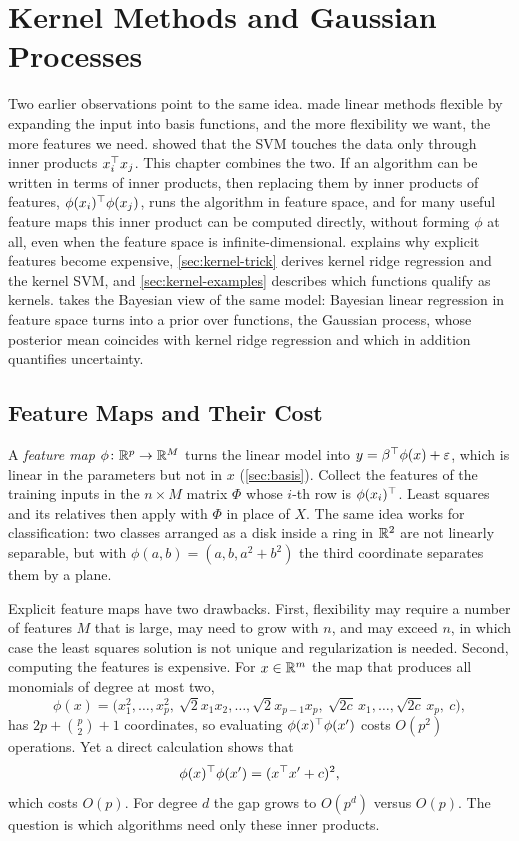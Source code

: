 \chapter{Kernel Methods and Gaussian Processes}\label{ch:kernels}

Two earlier observations point to the same idea.  made linear methods flexible by expanding the input into basis functions, and the more flexibility we want, the more features we need.  showed that the SVM touches the data only through inner products $x_i^{\top} x_j$. This chapter combines the two. If an algorithm can be written in terms of inner products, then replacing them by inner products of features, $\phi(x_i)^{\top}\phi(x_j)$, runs the algorithm in feature space, and for many useful feature maps this inner product can be computed directly, without forming $\phi$ at all, even when the feature space is infinite-dimensional.  explains why explicit features become expensive, \cref{sec:kernel-trick} derives kernel ridge regression and the kernel SVM, and \cref{sec:kernel-examples} describes which functions qualify as kernels.  takes the Bayesian view of the same model: Bayesian linear regression in feature space turns into a prior over functions, the Gaussian process, whose posterior mean coincides with kernel ridge regression and which in addition quantifies uncertainty.

\section{Feature Maps and Their Cost}\label{sec:feature-maps}

A \emph{feature map} $\phi\colon\mathbb{R}^p\to\mathbb{R}^M$ turns the linear model into $y=\beta^{\top}\phi(x)+\varepsilon$, which is linear in the parameters but not in $x$ (\cref{sec:basis}). Collect the features of the training inputs in the $n\times M$ matrix $\Phi$ whose $i$-th row is $\phi(x_i)^{\top}$. Least squares and its relatives then apply with $\Phi$ in place of $X$. The same idea works for classification: two classes arranged as a disk inside a ring in $\mathbb{R}^2$ are not linearly separable, but with $\phi(a,b)=(a,b,a^2+b^2)$ the third coordinate separates them by a plane.

Explicit feature maps have two drawbacks. First, flexibility may require a number of features $M$ that is large, may need to grow with $n$, and may exceed $n$, in which case the least squares solution is not unique and regularization is needed. Second, computing the features is expensive. For $x\in\mathbb{R}^m$ the map that produces all monomials of degree at most two,
\[
\phi(x)=\big(x_1^2,\dots,x_p^2,\ \sqrt2x_1x_2,\dots,\sqrt2x_{p-1}x_p,\ \sqrt{2c}\,x_1,\dots,\sqrt{2c}\,x_p,\ c\big),
\]
has $2p+\binom p2+1$ coordinates, so evaluating $\phi(x)^{\top}\phi(x')$ costs $O(p^2)$ operations. Yet a direct calculation shows that
\[
\phi(x)^{\top}\phi(x')=(x^{\top} x'+c)^2,
\]
which costs $O(p)$. For degree $d$ the gap grows to $O(p^d)$ versus $O(p)$. The question is which algorithms need only these inner products.


